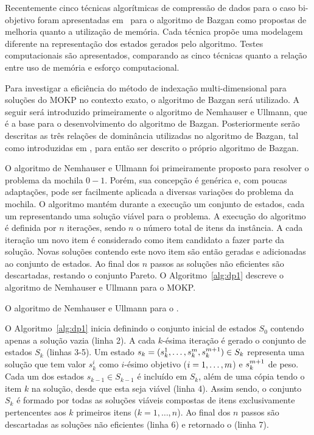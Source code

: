 Recentemente cinco técnicas algorítmicas de compressão de dados para o caso bi-objetivo foram
apresentadas em~\cite{correia2018} para o algoritmo de Bazgan
como propostas de melhoria quanto a utilização de memória.
Cada técnica propõe uma modelagem diferente na representação dos estados
gerados pelo algoritmo.
Testes computacionais são apresentados, comparando as cinco técnicas
quanto a relação entre uso de memória e esforço computacional.

Para investigar a eficiência do método de indexação multi-dimensional para
soluções do MOKP no contexto exato, o algoritmo de Bazgan será utilizado.
A seguir será introduzido primeiramente o algoritmo de Nemhauser e Ullmann,
que é a base para o desenvolvimento do algoritmo de Bazgan.
Posteriormente serão descritas as três relações de dominância utilizadas no algoritmo de Bazgan, tal como introduzidas em \cite{bazgan2009}, 
para então ser descrito o próprio algoritmo de Bazgan.

O algoritmo de Nemhauser e Ullmann foi primeiramente proposto para resolver o problema
da mochila $0-1$. Porém, sua concepção é genérica e, com poucas adaptações,
pode ser facilmente aplicada a diversas variações do problema da mochila.
O algoritmo mantém durante a execução um conjunto de estados, cada um representando uma solução
viável para o problema.
A execução do algoritmo é definida por $n$ iterações, sendo $n$ o número total de itens da instância.
A cada iteração um novo item é considerado como item candidato a fazer parte da solução.
Novas soluções contendo este novo item são então geradas e adicionadas
ao conjunto de estados.
Ao final dos $n$ passos as soluções não eficientes são descartadas, restando o conjunto Pareto.
O Algoritmo~\ref{alg:dp1} descreve o algoritmo de Nemhauser e Ullmann para o MOKP.

\begin{algorithm}
  \footnotesize
  \caption{O algoritmo de Nemhauser e Ullmann para o \mokp.}
  \label{alg:dp1}
  
\end{algorithm}

O Algoritmo~\ref{alg:dp1} inicia definindo o conjunto inicial de estados $S_0$
contendo apenas a solução vazia (linha 2).
A cada $k$-ésima iteração é gerado o conjunto de estados $S_k$ (linhas 3-5).
Um estado $s_k = (s_k^1, \ldots, s^m_k, s^{m+1}_k) \in S_k$ representa uma solução
que tem valor $s^i_k$ como $i$-ésimo objetivo ($i = 1, \ldots, m$)
e $s^{m+1}_k$ de peso.
Cada um dos estados $s_{k-1} \in S_{k-1}$ é incluído em $S_k$, além de uma cópia tendo
o item $k$ na solução, desde que esta seja viável (linha 4).
Assim sendo, o conjunto $S_k$ é formado por todas as soluções viáveis compostas de itens exclusivamente
pertencentes aos $k$ primeiros itens ($k = 1, \ldots, n$).
Ao final dos $n$ passos são descartadas as soluções não eficientes (linha 6) e retornado
o \paretoset{} (linha 7).

